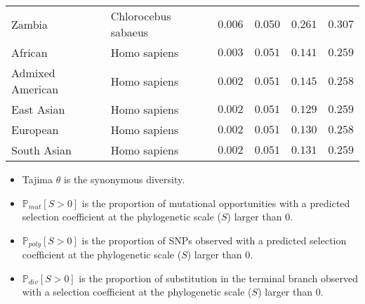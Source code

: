 \documentclass{article}
\newcommand{\Sphy}{S}
\begin{document}
\begin{center}
\begin{longtable}{|l|l|r|r|r|r|}
            Zambia               & Chlorocebus sabaeus & $ 0.006$              & $ 0.050$                & $ 0.261$                 & $ 0.307$                \\
            African              & Homo sapiens        & $ 0.003$              & $ 0.051$                & $ 0.141$                 & $ 0.259$                \\
            Admixed American     & Homo sapiens        & $ 0.002$              & $ 0.051$                & $ 0.145$                 & $ 0.258$                \\
            East Asian           & Homo sapiens        & $ 0.002$              & $ 0.051$                & $ 0.129$                 & $ 0.259$                \\
            European             & Homo sapiens        & $ 0.002$              & $ 0.051$                & $ 0.130$                 & $ 0.258$                \\
            South Asian          & Homo sapiens        & $ 0.002$              & $ 0.051$                & $ 0.131$                 & $ 0.259$                \\
        \end{longtable}
    \end{center}
    \begin{itemize}
        \item Tajima $\theta$ is the synonymous diversity.
        \item $\mathbb{P}_{mut}[S>0]$ is the proportion of mutational opportunities with a predicted selection coefficient at the phylogenetic scale ($\Sphy$) larger than 0.
        \item $\mathbb{P}_{poly}[S>0]$ is the proportion of SNPs observed with a predicted selection coefficient at the phylogenetic scale ($\Sphy$) larger than 0.
        \item $\mathbb{P}_{div}[S>0]$ is the proportion of substitution in the terminal branch observed with a selection coefficient at the phylogenetic scale ($\Sphy$) larger than 0.
    \end{itemize}
\end{document}
